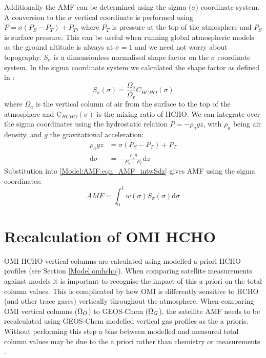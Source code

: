   Additionally the AMF can be determined using the sigma ($\sigma$) coordinate system.
  A conversion to the $\sigma$ vertical coordinate is performed using $P = \sigma (P_S - P_T) + P_T$, where $P_T$ is pressure at the top of the atmosphere and $P_S$ is surface pressure.
  This can be useful when running global atmospheric models as the ground altitude is always at $\sigma=1$ and we need not worry about topography. 
  $S_\sigma$ is a dimensionless normalised shape factor on the $\sigma$ coordinate system.
  In the sigma coordinate system we calculated the shape factor as defined in \textcite{Palmer2001}:
  \begin{equation}
    \label{Model:AMF:eqn_ShapeFactorSigma}
    S_\sigma(\sigma) = \frac{\Omega_a}{\Omega_v}C_{HCHO}(\sigma)
  \end{equation}
  where $\Omega_a$ is the vertical column of air from the surface to the top of the atmosphere and C$_{HCHO}(\sigma)$ is the mixing ratio of HCHO.
  We can integrate over the sigma coordinates using the hydrostatic relation $P = - \rho_a g z$, with $\rho_a$ being air density, and $g$ the gravitational acceleration:
  \begin{align*}
    \rho_a g z & = \sigma \left( P_S - P_T \right) + P_T \\
    \mathrm{d}\sigma  & = - \frac{ \rho_a g }{ P_S - P_T } \mathrm{d}z
  \end{align*}
  Substitution into \ref{Model:AMF:eqn_AMF_intwSdz} gives AMF using the sigma coordinates:
  \begin{equation} \label{Model:AMF:eqn_AMFintwSdsigma}
    AMF = \int_0^1 w(\sigma) S_\sigma(\sigma) \mathrm{d}\sigma
  \end{equation}

\section{Recalculation of OMI HCHO}
  \label{Model:omiRecalc}
  
  
  OMI HCHO vertical columns are calculated using modelled a priori HCHO profiles (see Section \ref{Model:omhcho}).
  When comparing satellite measurements against models it is important to recognise the impact of this a priori on the total column values.
  This is complicated by how OMI is differently sensitive to HCHO (and other trace gases) vertically throughout the atmosphere.
  When comparing OMI vertical columns ($\Omega_{O}$) to GEOS-Chem ($\Omega_{G}$), the satellite AMF needs to be recalculated using GEOS-Chem modelled vertical gas profiles as the a prioris.
  Without performing this step a bias between modelled and measured total column values may be due to the a priori rather than chemistry or measurements \parencite{Palmer2001, Lamsal2014}.
  
